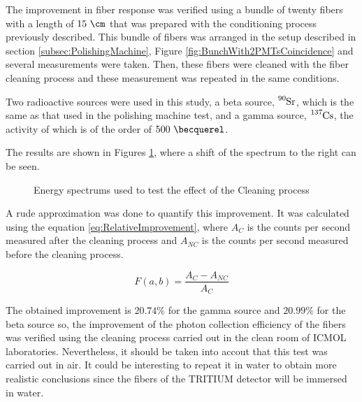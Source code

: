 The improvement in fiber response was verified using a bundle of twenty fibers with a length of $15~\cm$ that was prepared with the conditioning process previously described. This bundle of fibers was arranged in the setup described in section \ref{subsec:PolishingMachine}, Figure \ref{fig:BunchWith2PMTsCoincidence} and several measurements were taken. Then, these fibers were cleaned with the fiber cleaning process and these measurement was repeated in the same conditions.

Two radioactive sources were used in this study, a beta source, $\ce{^{90}Sr}$, which is the same as that used in the polishing machine test, and a gamma source, $\ce{^{137}Cs}$, the activity of which is of the order of $500~\becquerel$.

The results are shown in Figures \ref{fig:ResultsOfCleaningProcess}, where a shift of the spectrum to the right can be seen. 

\begin{figure}[htbp]
 \centering
    \newline
 \caption{Energy spectrums used to test the effect of the Cleaning process}
 \label{fig:ResultsOfCleaningProcess}
\end{figure}

A rude approximation was done to quantify this improvement. It was calculated using the equation \ref{eq:RelativeImprovement}, where $A_{C}$ is the counts per second measured after the cleaning process and $A_{NC}$ is the counts per second measured before the cleaning process.

\begin{equation}
F(a,b)=\frac{A_{C}-A_{NC}}{A_{C}}
\label{eq:RelativeImprovement}
\end{equation}

The obtained improvement is $20.74\%$ for the gamma source and $20.99\%$ for the beta source so, the improvement of the photon collection efficiency of the fibers was verified using the cleaning process carried out in the clean room of ICMOL laboratories. Nevertheless, it should be taken into accout that this test was carried out in air. It could be interesting to repeat it in water to obtain more realistic conclusions since the fibers of the TRITIUM detector will be immersed in water.